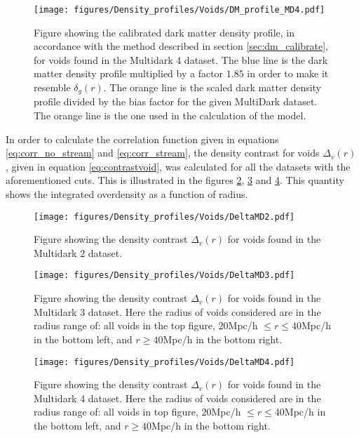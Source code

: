 \begin{figure}[H]
    \texttt{[image: figures/Density\_profiles/Voids/DM\_profile\_MD4.pdf]}
    \caption{Figure showing the calibrated dark matter density profile, in accordance with the method described in section \ref{sec:dm_calibrate}, for voids found in the Multidark 4 dataset. The blue line is the dark matter density profile multiplied by a factor $1.85$ in order to make it resemble $\delta_g(r)$. The orange line is the scaled dark matter density profile divided by the bias factor for the given MultiDark dataset. The orange line is the one used in the calculation of the model.}
    \label{fig:deltadmMD4}
\end{figure}
In order to calculate the correlation function given in equations \ref{eq:corr_no_stream} and \ref{eq:corr_stream}, the density contrast for voids $\Delta_v(r)$, given in equation \ref{eq:contrastvoid}, was calculated for all the datasets with the aforementioned cuts. This is illustrated in the figures \ref{fig:DeltaMD2}, \ref{fig:DeltaMD3} and \ref{fig:DeltaMD4}. This quantity shows the integrated overdensity as a function of radius.
\begin{figure}[H]
    \texttt{[image: figures/Density\_profiles/Voids/DeltaMD2.pdf]}
    \caption{Figure showing the density contrast $\Delta_v(r)$ for voids found in the Multidark 2 dataset.}
    \label{fig:DeltaMD2}
\end{figure}
\begin{figure}[H]
    \texttt{[image: figures/Density\_profiles/Voids/DeltaMD3.pdf]}
    \caption{Figure showing the density contrast $\Delta_v(r)$ for voids found in the Multidark 3 dataset. Here the radius of voids considered are in the radius range of: all voids in the top figure, $20$Mpc/h $\leq r\leq 40$Mpc/h in the bottom left, and $r\geq 40$Mpc/h in the bottom right.}
    \label{fig:DeltaMD3}
\end{figure}
\begin{figure}[H]
    \texttt{[image: figures/Density\_profiles/Voids/DeltaMD4.pdf]}
    \caption{Figure showing the density contrast $\Delta_v(r)$ for voids found in the Multidark 4 dataset. Here the radius of voids considered are in the radius range of: all voids in top figure, $20$Mpc/h $\leq r\leq 40$Mpc/h in the bottom left, and $r\geq 40$Mpc/h in the bottom right.}
    \label{fig:DeltaMD4}
\end{figure}


